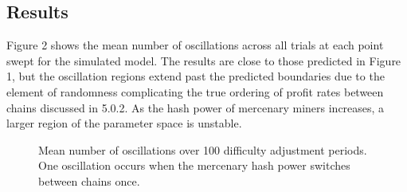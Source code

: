 \documentclass[10pt, preprint]{aastex}
\begin{document}
\subsection{Results}
Figure 2 shows the mean number of oscillations across all trials at each point swept for the simulated model.  The results are close to those predicted in Figure 1, but the oscillation regions extend past the predicted boundaries due to the element of randomness complicating the true ordering of profit rates between chains discussed in 5.0.2.  As the hash power of mercenary miners increases, a larger region of the parameter space is unstable.
\begin{figure}
	\centering
	\qquad
	\qquad
	\qquad
	\qquad
	\caption{Mean number of oscillations over 100 difficulty adjustment periods.  One oscillation occurs when the mercenary hash power switches between chains once.}
\end{figure}
\end{document}
